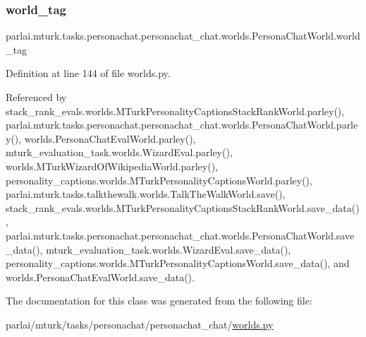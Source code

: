 \mbox{\label{classparlai_1_1mturk_1_1tasks_1_1personachat_1_1personachat__chat_1_1worlds_1_1PersonaChatWorld_a254ecf0c1c1d37f2f2027f4206abc321}} 
\subsubsection{\texorpdfstring{world\+\_\+tag}{world\_tag}}
{\footnotesize\ttfamily parlai.\+mturk.\+tasks.\+personachat.\+personachat\+\_\+chat.\+worlds.\+Persona\+Chat\+World.\+world\+\_\+tag}



Definition at line 144 of file worlds.\+py.



Referenced by stack\+\_\+rank\+\_\+evals.\+worlds.\+M\+Turk\+Personality\+Captions\+Stack\+Rank\+World.\+parley(), parlai.\+mturk.\+tasks.\+personachat.\+personachat\+\_\+chat.\+worlds.\+Persona\+Chat\+World.\+parley(), worlds.\+Persona\+Chat\+Eval\+World.\+parley(), mturk\+\_\+evaluation\+\_\+task.\+worlds.\+Wizard\+Eval.\+parley(), worlds.\+M\+Turk\+Wizard\+Of\+Wikipedia\+World.\+parley(), personality\+\_\+captions.\+worlds.\+M\+Turk\+Personality\+Captions\+World.\+parley(), parlai.\+mturk.\+tasks.\+talkthewalk.\+worlds.\+Talk\+The\+Walk\+World.\+save(), stack\+\_\+rank\+\_\+evals.\+worlds.\+M\+Turk\+Personality\+Captions\+Stack\+Rank\+World.\+save\+\_\+data(), parlai.\+mturk.\+tasks.\+personachat.\+personachat\+\_\+chat.\+worlds.\+Persona\+Chat\+World.\+save\+\_\+data(), mturk\+\_\+evaluation\+\_\+task.\+worlds.\+Wizard\+Eval.\+save\+\_\+data(), personality\+\_\+captions.\+worlds.\+M\+Turk\+Personality\+Captions\+World.\+save\+\_\+data(), and worlds.\+Persona\+Chat\+Eval\+World.\+save\+\_\+data().



The documentation for this class was generated from the following file\+:\begin{DoxyCompactItemize}
\item 
parlai/mturk/tasks/personachat/personachat\+\_\+chat/\hyperlink{parlai_2mturk_2tasks_2personachat_2personachat__chat_2worlds_8py}{worlds.\+py}\end{DoxyCompactItemize}
